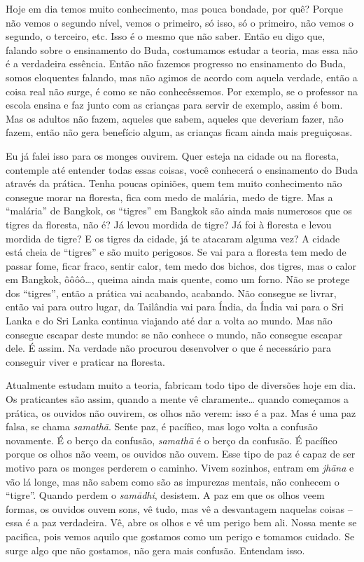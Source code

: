 Hoje em dia temos muito conhecimento, mas pouca bondade, por quê?
Porque não vemos o segundo nível, vemos o primeiro, só isso, só o
primeiro, não vemos o segundo, o terceiro, etc. Isso é o mesmo que não
saber. Então eu digo que, falando sobre o ensinamento do Buda,
costumamos estudar a teoria, mas essa não é a verdadeira essência.
Então não fazemos progresso no ensinamento do Buda, somos eloquentes
falando, mas não agimos de acordo com aquela verdade, então a coisa
real não surge, é como se não conhecêssemos. Por exemplo, se o
professor na escola ensina e faz junto com as crianças para servir de
exemplo, assim é bom. Mas os adultos não fazem, aqueles que sabem,
aqueles que deveriam fazer, não fazem, então não gera benefício algum,
as crianças ficam ainda mais preguiçosas. 

Eu já falei isso para os monges ouvirem. Quer esteja na cidade ou na
floresta, contemple até entender todas essas coisas, você conhecerá o
ensinamento do Buda através da prática. Tenha poucas opiniões, quem tem
muito conhecimento não consegue morar na floresta, fica com medo de
malária, medo de tigre. Mas a “malária” de Bangkok, os “tigres” em
Bangkok são ainda mais numerosos que os tigres da floresta, não é? Já
levou mordida de tigre? Já foi à floresta e levou mordida de tigre? E
os tigres da cidade, já te atacaram alguma vez? A cidade está cheia de
“tigres” e são muito perigosos. Se vai para a floresta tem medo de
passar fome, ficar fraco, sentir calor, tem medo dos bichos, dos
tigres, mas o calor em Bangkok, ôôôô…, queima ainda mais quente, como
um forno. Não se protege dos “tigres”, então a prática vai acabando,
acabando. Não consegue se livrar, então vai para outro lugar, da
Tailândia vai para Índia, da Índia vai para o Sri Lanka e do Sri Lanka
continua viajando até dar a volta ao mundo. Mas não consegue escapar
deste mundo: se não conhece o mundo, não consegue escapar dele. É
assim. Na verdade não procurou desenvolver o que é necessário para
conseguir viver e praticar na floresta.

Atualmente estudam muito a teoria, fabricam todo tipo de diversões
hoje em dia. Os praticantes são assim, quando a mente vê claramente…
quando começamos a prática, os ouvidos não ouvirem, os olhos não verem:
isso é a paz. Mas é uma paz falsa, se chama \textit{samath\=a}. Sente
paz, é pacífico, mas logo volta a confusão novamente. É o berço da
confusão, \textit{samath\=a} é o berço da confusão. É pacífico porque
os olhos não veem, os ouvidos não ouvem. Esse tipo de paz é capaz de
ser motivo para os monges perderem o caminho. Vivem sozinhos, entram em
\textit{jh\=ana} e vão lá longe, mas não sabem como são as impurezas
mentais, não conhecem o “tigre”. Quando perdem o \textit{sam\=adhi},
desistem. A paz em que os olhos veem formas, os ouvidos ouvem sons, vê
tudo, mas vê a desvantagem naquelas coisas – essa é a paz verdadeira.
Vê, abre os olhos e vê um perigo bem ali. Nossa mente se pacifica, pois
vemos aquilo que gostamos como um perigo e tomamos cuidado. Se surge
algo que não gostamos, não gera mais confusão. Entendam isso. 

